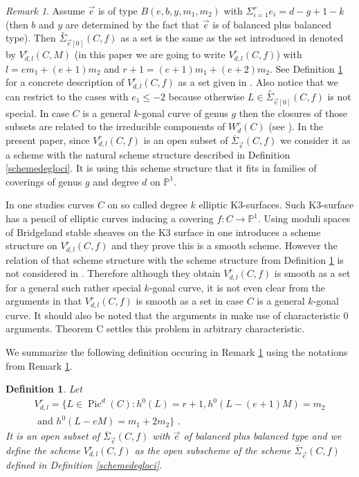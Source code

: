 \documentclass{article}
\DeclareMathOperator{\Pic}{Pic}
\newtheorem{definition}{Definition}
\theoremstyle{definition}
\theoremstyle{remark}
\newtheorem{remark}{Remark}
\begin{document}
\begin{remark}\label{remV}
Assume $\overrightarrow{e}$ is of type $B(e,b,y,m_1,m_2)$ with $\Sigma _{i=1}^r e_i=d-g+1-k$ (then $b$ and $y$ are determined by the fact that $\overrightarrow {e}$ is of balanced plus balanced type).
Then $\overset{\circ}{\Sigma}_{\overrightarrow {e}[0]}(C,f)$ as a set is the same as the set introduced in \cite{FFR} denoted by $V^r_{d,l}(C,M)$ (in this paper we are going to write $V^r_{d,l}(C,f)$) with $l=em_1+(e+1)m_2$ and $r+1=(e+1)m_1+(e+2)m_2$.
See Definition \ref{defV} for a concrete description of $V^r_{d,l}(C,f)$ as a set given in \cite{FFR}.
Also notice that we can restrict to the cases with $e_1 \leq -2$ because otherwise $L \in \overset{\circ}{\Sigma}_{\overrightarrow {e}[0]}(C,f)$ is not special.
In case $C$ is a general $k$-gonal curve of genus $g$ then the closures of those subsets are related to the irreducible components of $W^r_d(C)$ (see \cite{FFR}).
In the present paper, since $V^r_{d,l}(C,f)$ is an open subset of $\overline{\Sigma}_{\overrightarrow{e}}(C,f)$ we consider it as a scheme with the natural scheme structure described in Definition \ref{schemedegloci}.
It is using this scheme structure that it fits in families of coverings of genus $g$ and degree $d$ on $\mathbb{P}^1$.

In \cite{FFR} one studies curves $C$ on so called degree $k$ elliptic K3-surfaces.
Such K3-surface has a pencil of elliptic curves inducing a covering $f:C \rightarrow \mathbb{P}^1$.
Using moduli spaces of Bridgeland stable sheaves on the K3 surface in \cite{FFR} one introduces a scheme structure on $V^r_{d,l}(C,f)$ and they prove this is a smooth scheme.
However the relation of that scheme structure with the scheme structure from Definition \ref{defV} is not considered in \cite{FFR}.
Therefore although they obtain $V^r_{d,l}(C,f)$ is smooth as a set for a general such rather special $k$-gonal curve, it is not even clear from the arguments in \cite{FFR} that $V^r_{d,l}(C,f)$ is smooth as a set in case $C$ is a general $k$-gonal curve.
It should also be noted that the arguments in \cite{FFR} make use of characteristic 0 arguments.
Theorem C settles this problem in arbitrary characteristic.
\end{remark}

We summarize the following definition occuring in Remark \ref{remV} using the notations from Remark \ref{remV}.
\begin{definition}\label{defV}
Let
\begin{multline*}
V^r_{d,l}= \{L \in \Pic^d(C) : h^0(L)=r+1, h^0(L-(e+1)M)=m_2 \\ \text { and } h^0(L-eM)=m_1+2m_2 \} \text { .}
\end{multline*}
It is an open subset of $\overline{\Sigma}_{\overrightarrow {e}}(C,f)$ with $\overrightarrow {e}$ of balanced plus balanced type and we define the scheme $V^r_{d,l}(C,f)$ as the open subscheme of the scheme $\overline{\Sigma}_{\overrightarrow {e}}(C,f)$ defined in Definition \ref{schemedegloci}.
\end{definition}
\end{document}
